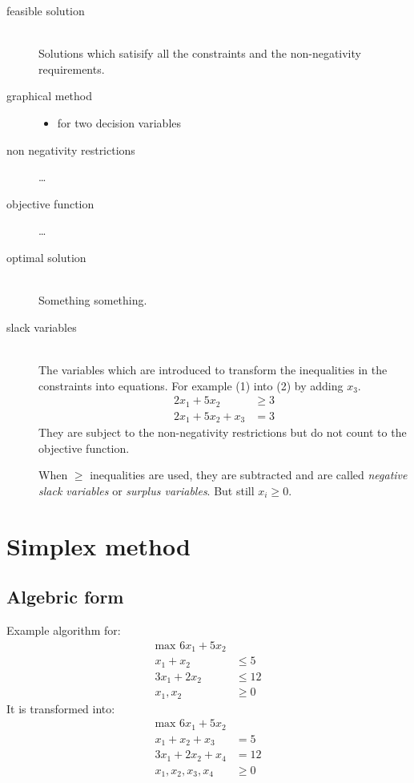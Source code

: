\documentclass[a4paper, 12pt]{article}
\begin{document}
\begin{description}
\item[feasible solution] \hfill \\
    Solutions which satisify all the constraints and the non-negativity
    requirements.

\item[graphical method] \hfill
    \begin{itemize}
    \item for two decision variables
    \end{itemize}
    
\item[non negativity restrictions] \ldots

\item[objective function] \ldots

\item[optimal solution] \hfill \\
    Something something.
    
\item[slack variables] \hfill \\
    The variables which are introduced to transform the inequalities in the
    constraints into equations. For example (1) into (2) by adding $x_3$.
    \begin{align}
        2x_1+5x_2&\ge3\\
        2x_1+5x_2+x_3&=3
    \end{align}
    They are subject to the non-negativity restrictions but do not count to the
    objective function.
    
    When $\ge$ inequalities are used, they are subtracted and are called
    \emph{negative slack variables} or \emph{surplus variables}. But still
    $x_i \ge 0$.

\end{description}

\section{Simplex method}

\subsection{Algebric form}

Example algorithm for:
\begin{align*}
    \text{max } 6x_1 + 5x_2 \\
    x_1 + x_2 &\le 5 \\
    3x_1 + 2x_2 &\le 12 \\
    x_1,x_2 &\ge 0
\end{align*}
It is transformed into:
\begin{align*}
    \text{max } 6x_1 + 5x_2 \\
    x_1 + x_2 + x_3 &= 5 \\
    3x_1 + 2x_2 + x_4 &= 12 \\
    x_1,x_2,x_3,x_4 &\ge 0
\end{align*}
\end{document}
